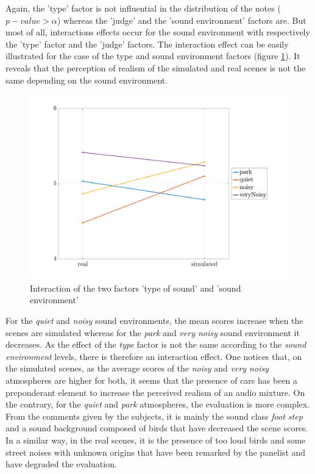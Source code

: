 \documentclass[11pt,letter]{article}
\begin{document}

Again, the 'type' factor is not influential in the distribution of the notes ($p-value > \alpha$) whereas the 'judge' and the 'sound environment' factors are. But most of all, interactions effects occur for the sound environment with respectively the 'type' factor and the 'judge' factors. The interaction effect can be easily illustrated for the case of the type and sound environment factors (figure \ref{fig:interaction}). It reveals that the perception of realism of the simulated and real scenes is not the same depending on the sound environment. 


\begin{figure}[hbtp]
\centering
\includegraphics[width=.5\linewidth]{pictures/testPerceptif_interactionAmbianceCOLOR_EN.pdf}
\caption{Interaction of the two factors 'type of sound' and 'sound environment'}
\label{fig:interaction}
\end{figure}

For the \textit{quiet} and \textit{noisy} sound environments, the mean scores increase when the scenes are simulated whereas for the \textit{park} and \textit{very noisy} sound environment it decreases. As the effect of the \textit{type} factor is not the same according to the \textit{sound environment} levels, there is therefore an interaction effect. One notices that, on the simulated scenes, as the average scores of the \textit{noisy} and \textit{very noisy} atmospheres are higher for both, it seems that the presence of cars has been a preponderant element to increase the perceived realism of an audio mixture. On the contrary, for the \textit{quiet} and \textit{park} atmospheres, the evaluation is more complex. From the comments given by the subjects, it is mainly the sound class \textit{foot step} and a sound background composed of birds that have decreased the scene scores. In a similar way, in the real scenes, it is the presence of too loud birds and some street noises with unknown origins that have been remarked by the panelist and have degraded the evaluation.\\
\end{document}
